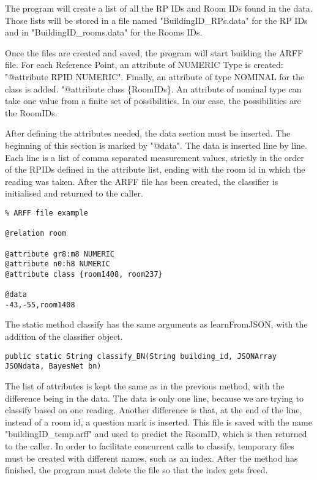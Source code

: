 \noindent
The program will create a list of all the RP IDs and Room IDs found in the data. Those lists will be stored in a file named "BuildingID\_RPs.data" for the RP IDs and in "BuildingID\_rooms.data" for the Rooms IDs. 

\noindent
Once the files are created and saved, the program will start building the ARFF file. For each Reference Point, an attribute of NUMERIC Type is created: "@attribute RPID NUMERIC". Finally, an attribute of type NOMINAL for the class is added. "@attribute class \{RoomIDs\}. An attribute of nominal type can take one value from a finite set of possibilities. In our case, the possibilities are the RoomIDs. 

\noindent
After defining the attributes needed, the data section must be inserted. The beginning of this section is marked by "@data". The data is inserted line by line. Each line is a list of comma separated measurement values, strictly in the order of the RPIDs defined in the attribute list, ending with the room id in which the reading was taken. After the ARFF file has been created, the classifier is initialised and returned to the caller.
\begin{lstlisting}
% ARFF file example

@relation room

@attribute gr8:m8 NUMERIC
@attribute n0:h8 NUMERIC
@attribute class {room1408, room237}

@data 
-43,-55,room1408
\end{lstlisting}

\noindent
The static method classify has the same arguments as learnFromJSON, with the addition of the classifier object. 
\begin{lstlisting} 
public static String classify_BN(String building_id, JSONArray JSONdata, BayesNet bn)
\end{lstlisting}
The list of attributes is kept the same as in the previous method, with the difference being in the data. The data is only one line, because we are trying to classify based on one reading. Another difference is that, at the end of the line, instead of a room id, a question mark is inserted. This file is saved with the name "buildingID\_temp.arff" and used to predict the RoomID, which is then returned to the caller. In order to facilitate concurrent calls to classify, temporary files must be created with different names, such as an index. After the method has finished, the program must delete the file so that the index gets freed.


